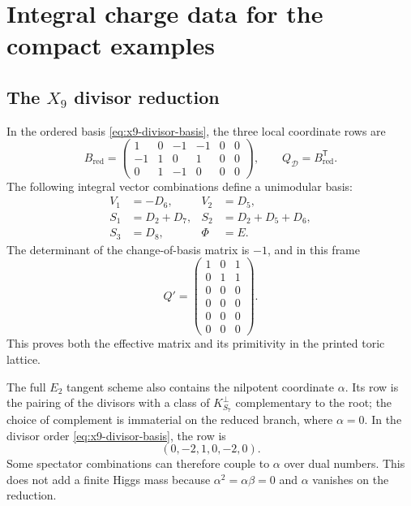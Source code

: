 \section{Integral charge data for the compact examples}
\label{app:matrices}

\subsection[The X9 divisor reduction]{The $X_9$ divisor reduction}

In the ordered basis \eqref{eq:x9-divisor-basis}, the three local coordinate
rows are
\begin{equation}
 B_{\mathrm{red}}
 =\begin{pmatrix}
  1&0&-1&-1&0&0\\
 -1&1& 0& 1&0&0\\
  0&1&-1& 0&0&0
 \end{pmatrix},
 \qquad
 Q_{\mathcal D}=B_{\mathrm{red}}^{\mathsf T}.
 \label{eq:app-x9-b}
\end{equation}
The following integral vector combinations define a unimodular basis:
\begin{align}
 V_1&=-D_6,&
 V_2&=D_5,\nonumber\\
 S_1&=D_2+D_7,&
 S_2&=D_2+D_5+D_6,\nonumber\\
 S_3&=D_8,&
 \Phi&=E.
 \label{eq:app-x9-basis-change}
\end{align}
The determinant of the change-of-basis matrix is $-1$, and in this frame
\begin{equation}
 Q'=
 \begin{pmatrix}
 1&0&1\\
 0&1&1\\
 0&0&0\\
 0&0&0\\
 0&0&0\\
 0&0&0
 \end{pmatrix}.
\end{equation}
This proves both the effective matrix and its primitivity in the printed
toric lattice.

The full $E_2$ tangent scheme also contains the nilpotent coordinate $\alpha$.
Its row is the pairing of the divisors with a class of $K_{S_7}^{\perp}$
complementary to the root; the choice of complement is immaterial on the
reduced branch, where $\alpha=0$. In the divisor order
\eqref{eq:x9-divisor-basis}, the row is
\begin{equation}
 (0,-2,1,0,-2,0).
 \label{eq:app-x9-alpha}
\end{equation}
Some spectator combinations can therefore couple to $\alpha$ over dual
numbers. This does not add a finite Higgs mass because
$\alpha^2=\alpha\beta=0$ and $\alpha$ vanishes on the reduction.

